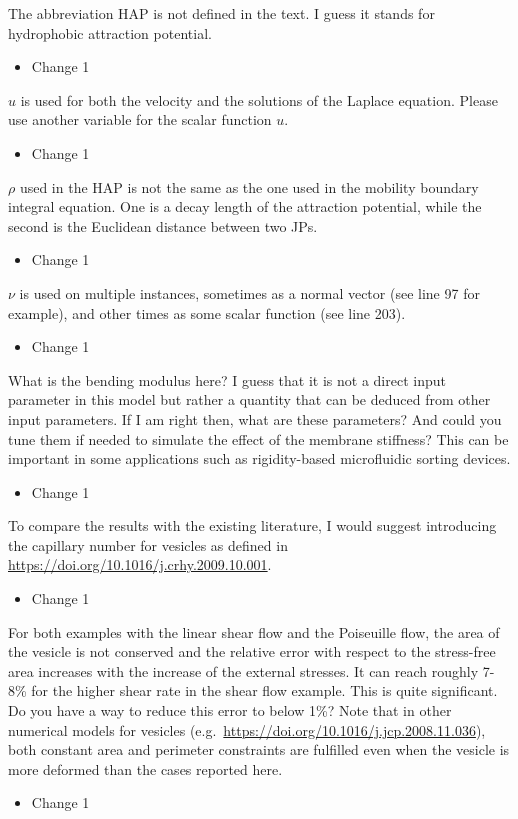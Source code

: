 \documentclass[11pt]{article}
\newcommand{\comment}[1]{{\color{blue} #1}}
\begin{document}
\noindent
\comment{The abbreviation HAP is not defined in the text. I guess it stands for hydrophobic attraction potential.
}
\begin{itemize}
  \item Change 1 
\end{itemize}

\noindent
\comment{$u$ is used for both the velocity and the solutions of the
Laplace equation. Please use another variable for the scalar function
$u$.}
\begin{itemize}
  \item Change 1 
\end{itemize}

\noindent
\comment{$\rho$ used in the HAP is not the same as the one used in the
mobility boundary integral equation. One is a decay length of the
attraction potential, while the second is the Euclidean distance between
two JPs.}
\begin{itemize}
  \item Change 1 
\end{itemize}

\noindent
\comment{$\nu$ is used on multiple instances, sometimes as a normal
vector (see line 97 for example), and other times as some scalar
function (see line 203).}
\begin{itemize}
  \item Change 1 
\end{itemize}

\noindent
\comment{What is the bending modulus here? I guess that it is not a
direct input parameter in this model but rather a quantity that can be
deduced from other input parameters. If I am right then, what are these
parameters? And could you tune them if needed to simulate the effect of
the membrane stiffness? This can be important in some applications such
as rigidity-based microfluidic sorting devices.}
\begin{itemize}
  \item Change 1 
\end{itemize}

\noindent
\comment{To compare the results with the existing literature, I would
suggest introducing the capillary number for vesicles as defined in
\url{https://doi.org/10.1016/j.crhy.2009.10.001}.}
\begin{itemize}
  \item Change 1 
\end{itemize}

\noindent
\comment{For both examples with the linear shear flow and the Poiseuille
flow, the area of the vesicle is not conserved and the relative error
with respect to the stress-free area increases with the increase of the
external stresses. It can reach roughly 7-8\% for the higher shear rate
in the shear flow example. This is quite significant. Do you have a way
to reduce this error to below 1\%? Note that in other numerical models
for vesicles (e.g.~\url{https://doi.org/10.1016/j.jcp.2008.11.036}),
both constant area and perimeter constraints are fulfilled even when the
vesicle is more deformed than the cases reported here.}
\begin{itemize}
  \item Change 1 
\end{itemize}
\end{document}
